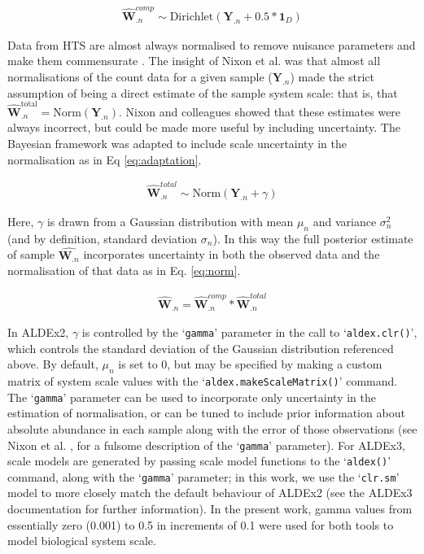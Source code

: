 \documentclass[10pt,letterpaper]{article}
\begin{document}
\begin{eqnarray}
	\label{eq:Dir}
	\hat{\mathbf{W}}^{comp}_{.n} \sim \mathrm{Dirichlet}(\mathbf{Y}_{.n} + 0.5 * \mathbf{1}_{D})
\end{eqnarray}

Data from HTS are almost always normalised to remove nuisance parameters and make them commensurate \cite{robinson_scaling_2010}. The insight of Nixon et al. \cite{nixon_scale_2024} was that almost all normalisations of the count data for a given sample ($\mathbf{Y}_{.n}$) made the strict assumption of being a direct estimate of the sample system scale: that is, that $\hat{\mathbf{W}}^{\mathrm{total}}_{.n} = \mathrm{Norm}(\mathbf{Y}_{.n})$. Nixon and colleagues showed that these estimates were always incorrect, but could be made more useful by including uncertainty. The Bayesian framework was adapted to include scale uncertainty in the normalisation as in Eq \ref{eq:adaptation}.

\begin{eqnarray}
	\label{eq:adaptation}
	\hat{\mathbf{W}}^{total}_{.n} \sim \mathrm{Norm}(\mathbf{Y}_{.n} + \gamma)
\end{eqnarray}

Here, $\gamma$ is drawn from a Gaussian distribution with mean $\mu_n$ and variance $\sigma^2_n$ (and by definition, standard deviation $\sigma_n$). In this way the full posterior estimate of sample $\hat{\mathbf{W}_{.n}}$ incorporates uncertainty in both the observed data and the normalisation of that data as in Eq. \ref{eq:norm}.

\begin{eqnarray}
	\label{eq:norm}
	\hat{\mathbf{W}}_{.n} = \hat{\mathbf{W}}^{comp}_{.n} * \hat{\mathbf{W}}^{total}_{.n}
\end{eqnarray}


In ALDEx2, $\gamma$ is controlled by the `\texttt{gamma}' parameter in the call to `\texttt{aldex.clr()}', which controls the standard deviation of the Gaussian distribution referenced above. By default, $\mu_n$ is set to 0, but may be specified by making a custom matrix of system scale values with the `\texttt{aldex.makeScaleMatrix()}' command. The `\texttt{gamma}' parameter can be used to incorporate only uncertainty in the estimation of normalisation, or can be tuned to include prior information about absolute abundance in each sample along with the error of those observations (see Nixon et al. \cite{nixon_incorporating_2025}, for a fulsome description of the `\texttt{gamma}' parameter). For ALDEx3, scale models are generated by passing scale model functions to the `\texttt{aldex()}' command, along with the `\texttt{gamma}' parameter; in this work, we use the `\texttt{clr.sm}' model to more closely match the default behaviour of ALDEx2 (see the ALDEx3 documentation for further information). In the present work, gamma values from essentially zero (0.001) to 0.5 in increments of 0.1 were used for both tools to model biological system scale. 
\end{document}
